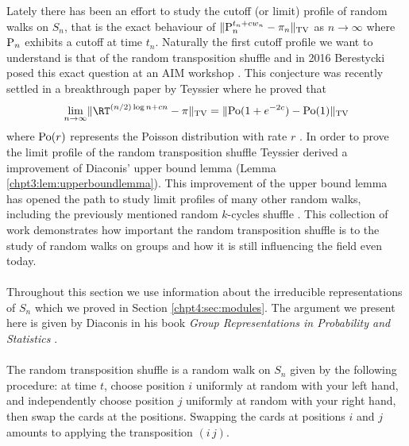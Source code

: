 \documentclass[11pt]{report}
\begin{document}
Lately there has been an effort to study the cutoff (or limit) profile of random walks on $S_{n}$, that is the exact behaviour of $\lVert \textnormal{P}_{n}^{t_{n}  +cw_{n}} - \pi_{n} \rVert_{\tiny \textnormal{TV}}$ as $n\to\infty$ where $\textnormal{P}_{n}$ exhibits a cutoff at time $t_{n}$. 
Naturally the first cutoff profile we want to understand is that of the random transposition shuffle and in 2016 Berestycki posed this exact question at an AIM workshop \cite{Bconj}. This conjecture was recently settled in a breakthrough paper by Teyssier where he proved that 
\[\lim_{n\to\infty}\lVert \RT^{(n/2)\log n +cn} - \pi \rVert_{\tiny \textnormal{TV}} =  \lVert \textnormal{Po}(1 + e^{-2c}) - \textnormal{Po}(1)\rVert_{\tiny \textnormal{TV}} \]
where $\textnormal{Po}(r)$ represents the Poisson distribution with rate $r$ \cite{teyssier2020limit}. In order to prove the limit profile of the random transposition shuffle Teyssier derived a improvement of Diaconis' upper bound lemma (Lemma \ref{chpt3:lem:upperboundlemma}). This improvement of the upper bound lemma has opened the path to study limit profiles of many other random walks, including the previously mentioned random $k$-cycles shuffle \cite{nestoridi2020limit, freslon2020cutoff}. 
This collection of work demonstrates how important the random transposition shuffle is to the study of random walks on groups and how it is still influencing the field even today.

\paragraph{}
Throughout this section we use 
information about the irreducible representations of $S_{n}$ which we 
proved in Section \ref{chpt4:sec:modules}. The argument we present here is 
given by Diaconis in his book \emph{Group Representations in Probability 
	and Statistics} \cite[Chapter 3D, Theorem 5]{Diaconis1988}.\\

\paragraph{}
The random transposition shuffle is a random walk on $S_{n}$ given by the following procedure: at time $t$, choose position $i$ uniformly at random with your left hand, and independently choose position $j$ uniformly at random with your right hand, then swap the cards at the positions. Swapping the cards at positions $i$ and $j$ amounts to applying the transposition $(i \, j)$.
\end{document}
